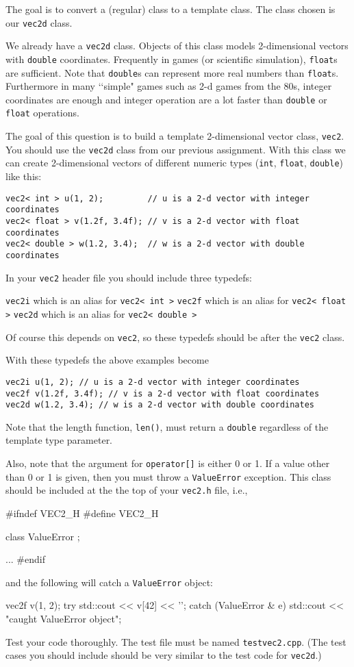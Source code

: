 
The goal is to convert a (regular) class to a template class. The class chosen is our
\verb!vec2d! class.

We already have a \verb!vec2d! class.
Objects of this class models 2-dimensional vectors with \verb!double!
coordinates.
Frequently in games (or scientific simulation),
\verb!float!s are sufficient.
Note that \verb!double!s can represent more real numbers than \verb!float!s.
Furthermore in many \lq\lq simple" games such as 2-d games from the 80s,
integer coordinates are enough and integer operation are a lot faster than
\verb!double! or \verb!float! operations. 

The goal of this question is to build a template 2-dimensional vector class,
\verb!vec2!.
You should use the \verb!vec2d! class from our previous assignment.
With this class we
can create 2-dimensional vectors of different numeric types
(\verb!int!, \verb!float!, \verb!double!) like this:
\begin{Verbatim}[frame=single]
vec2< int > u(1, 2);         // u is a 2-d vector with integer coordinates
vec2< float > v(1.2f, 3.4f); // v is a 2-d vector with float coordinates
vec2< double > w(1.2, 3.4);  // w is a 2-d vector with double coordinates
\end{Verbatim}
  
In your \verb!vec2! header file you should include three typedefs:
\begin{tightlist}
\li \verb!vec2i! which is an alias for \verb!vec2< int >!
\li \verb!vec2f! which is an alias for \verb!vec2< float >!
\li \verb!vec2d! which is an alias for \verb!vec2< double >!
\end{tightlist}
Of course this depends on \verb!vec2!,
so these typedefs should be after the \verb!vec2! class.

With these typedefs the above examples become
\begin{Verbatim}[frame=single]
vec2i u(1, 2); // u is a 2-d vector with integer coordinates
vec2f v(1.2f, 3.4f); // v is a 2-d vector with float coordinates
vec2d w(1.2, 3.4); // w is a 2-d vector with double coordinates
\end{Verbatim}

Note that the length function,
\verb!len()!,
must return a \verb!double! regardless of the template type parameter.

Also, note that the argument for \verb!operator[]! is either 0 or 1.
If a value other than 0 or 1 is given, then you must
throw a \verb!ValueError! exception. This class should be included
at the the top of your \verb!vec2.h! file, i.e.,
\begin{console}
#ifndef VEC2_H
#define VEC2_H

class ValueError
{};

...
#endif
\end{console}
and the following will catch a \verb!ValueError! object:
\begin{console}
vec2f v(1, 2);
try
{
    std::cout << v[42] << '\n';
}
catch (ValueError & e)
{
    std::cout << "caught ValueError object\n";
}
\end{console}

Test your code thoroughly.
The test file must be named \verb!testvec2.cpp!.
(The test cases you should include should be very similar to the test code
for \verb!vec2d!.)
